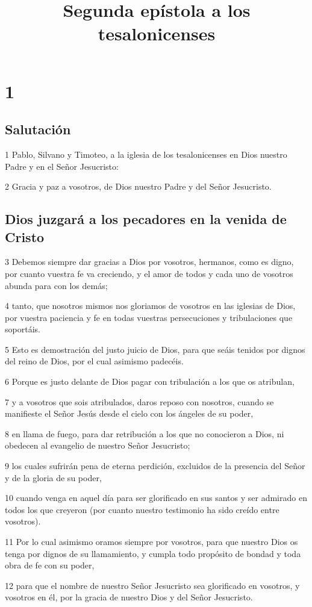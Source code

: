 
\title{Segunda epístola a los tesalonicenses}

\chapter{1}

\section*{Salutación}

\par 1 Pablo, Silvano y Timoteo, a la iglesia de los tesalonicenses en Dios nuestro Padre y en el Señor Jesucristo:
\par 2 Gracia y paz a vosotros, de Dios nuestro Padre y del Señor Jesucristo.

\section*{Dios juzgará a los pecadores en la venida de Cristo}

\par 3 Debemos siempre dar gracias a Dios por vosotros, hermanos, como es digno, por cuanto vuestra fe va creciendo, y el amor de todos y cada uno de vosotros abunda para con los demás;
\par 4 tanto, que nosotros mismos nos gloriamos de vosotros en las iglesias de Dios, por vuestra paciencia y fe en todas vuestras persecuciones y tribulaciones que soportáis.
\par 5 Esto es demostración del justo juicio de Dios, para que seáis tenidos por dignos del reino de Dios, por el cual asimismo padecéis.
\par 6 Porque es justo delante de Dios pagar con tribulación a los que os atribulan,
\par 7 y a vosotros que sois atribulados, daros reposo con nosotros, cuando se manifieste el Señor Jesús desde el cielo con los ángeles de su poder,
\par 8 en llama de fuego, para dar retribución a los que no conocieron a Dios, ni obedecen al evangelio de nuestro Señor Jesucristo;
\par 9 los cuales sufrirán pena de eterna perdición, excluidos de la presencia del Señor y de la gloria de su poder,
\par 10 cuando venga en aquel día para ser glorificado en sus santos y ser admirado en todos los que creyeron (por cuanto nuestro testimonio ha sido creído entre vosotros).
\par 11 Por lo cual asimismo oramos siempre por vosotros, para que nuestro Dios os tenga por dignos de su llamamiento, y cumpla todo propósito de bondad y toda obra de fe con su poder,
\par 12 para que el nombre de nuestro Señor Jesucristo sea glorificado en vosotros, y vosotros en él, por la gracia de nuestro Dios y del Señor Jesucristo.

